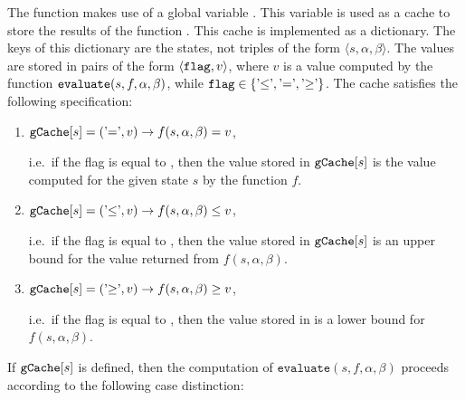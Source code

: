 The function  makes use of a global variable .  This variable is used as a
cache to store the results of the function .  This cache is implemented as a dictionary.  The
keys of this dictionary are the states, not triples of the form $\langle s, \alpha, \beta \rangle$.  The values
are stored in pairs of the form $\langle \texttt{flag}, v \rangle$, where $v$ is a value computed by the
function $\texttt{evaluate}(s, f, \alpha, \beta)$, while $\texttt{flag} \in \{ \mbox{'$\leq$'}, \mbox{'$=$'}, \mbox{'$\geq$'}\}$.
The cache satisfies the following specification:
\begin{enumerate}
\item $\texttt{gCache}[s] = (\mbox{'$=$'}, v) \rightarrow f(s, \alpha, \beta) = v$,

      i.e.~if the flag is equal to \quoted{=}, then the value stored in $\texttt{gCache}[s]$
      is the value computed for the given state $s$ by the function $f$.
\item $\texttt{gCache}[s] = (\mbox{'$\leq$'}, v) \rightarrow f(s, \alpha, \beta) \leq v$,

      i.e.~if the flag is equal to \quoted{\leq}, then the value stored in $\texttt{gCache}[s]$
      is an upper bound for the value returned from $f(s, \alpha, \beta)$.

\item $\texttt{gCache}[s] = (\mbox{'$\geq$'}, v) \rightarrow f(s, \alpha, \beta) \geq v$,

      i.e.~if the flag is equal to \quoted{\geq}, then the value stored in 
      is a lower bound for $f(s, \alpha, \beta)$.
\end{enumerate}
If $\texttt{gCache}[s]$ is defined, then the computation of $\texttt{evaluate}(s, f, \alpha, \beta)$
proceeds according to the following case distinction:
